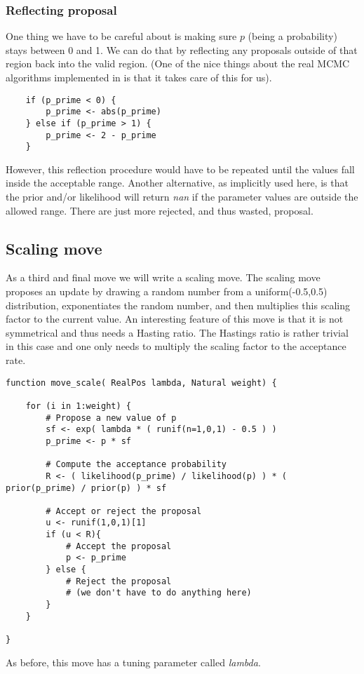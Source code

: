 \subsubsection{Reflecting proposal}
One thing we have to be careful about is making sure $p$ (being a probability) stays between 0 and 1.
We can do that by reflecting any proposals outside of that region back into the valid region.
(One of the nice things about the real MCMC algorithms implemented in \RevBayes is that it takes care of this for us).
{\tt \begin{snugshade*}
\begin{lstlisting}    
	if (p_prime < 0) {
		p_prime <- abs(p_prime)
	} else if (p_prime > 1) {
		p_prime <- 2 - p_prime
	}
\end{lstlisting}
\end{snugshade*}}
However, this reflection procedure would have to be repeated until the values fall inside the acceptable range.
Another alternative, as implicitly used here, is that the prior and/or likelihood will return \emph{nan} if the parameter values are outside the allowed range.
There are just more rejected, and thus wasted, proposal.


\subsection{Scaling move}
As a third and final move we will write a scaling move.
The scaling move proposes an update by drawing a random number from a uniform(-0.5,0.5) distribution, exponentiates the random number, and then multiplies this scaling factor to the current value.
An interesting feature of this move is that it is not symmetrical and thus needs a Hasting ratio.
The Hastings ratio is rather trivial in this case and one only needs to multiply the scaling factor to the acceptance rate.
{\tt \begin{snugshade*}
\begin{lstlisting}    
function move_scale( RealPos lambda, Natural weight) {

    for (i in 1:weight) {
        # Propose a new value of p
        sf <- exp( lambda * ( runif(n=1,0,1) - 0.5 ) )
        p_prime <- p * sf

        # Compute the acceptance probability
        R <- ( likelihood(p_prime) / likelihood(p) ) * ( prior(p_prime) / prior(p) ) * sf
    
        # Accept or reject the proposal
        u <- runif(1,0,1)[1]
        if (u < R){
            # Accept the proposal
            p <- p_prime
        } else {
            # Reject the proposal
            # (we don't have to do anything here)
        }
    }
    
}
\end{lstlisting}
\end{snugshade*}}
As before, this move has a tuning parameter called \emph{lambda}.

